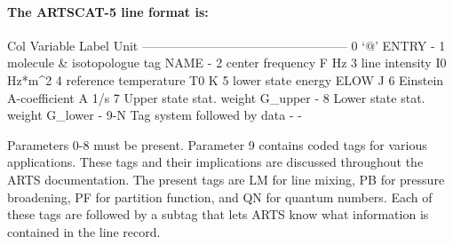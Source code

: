 \paragraph*{The ARTSCAT-5 line format is:}
\begin{code}

Col  Variable                        Label    Unit
--------------------------------------------------
 0   `@'                             ENTRY       -
 1   molecule & isotopologue tag      NAME       -
 2   center frequency                    F      Hz
 3   line intensity                     I0  Hz*m^2
 4   reference temperature              T0       K
 5   lower state energy               ELOW       J
 6   Einstein A-coefficient              A     1/s 
 7   Upper state stat. weight      G_upper       -
 8   Lower state stat. weight      G_lower       -
9-N  Tag system followed by data         -       -

\end{code}
Parameters 0-8 must be present. Parameter 9 contains coded tags for various applications.
These tags and their implications are discussed throughout
the ARTS documentation.  The present tags are LM for
line mixing, PB for pressure broadening, PF for partition
function, and QN for quantum numbers.  Each of these tags are followed by a subtag that lets
ARTS know what information is contained in the line record.

